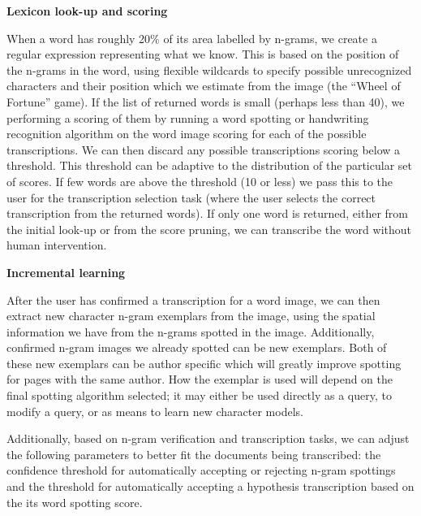 \documentclass[ms]{byuprop}
\begin{document}
\textbf{Lexicon look-up and scoring}

\begin{addmargin}[3em]{3em}
When a word has roughly 20\% of its area labelled by n-grams, we create a regular expression representing what we know. This is based on the position of the n-grams in the word, using flexible wildcards to specify possible unrecognized characters and their position which we estimate from the image (the ``Wheel of Fortune'' game). If the list of returned words is small (perhaps less than 40), we performing a scoring of them by running a word spotting or handwriting recognition algorithm on the word image scoring for each of the possible transcriptions. We can then discard any possible transcriptions scoring below a threshold. This threshold can be adaptive to the distribution of the particular set of scores. If few words are above the threshold (10 or less) we pass this to the user for the transcription selection task (where the user selects the correct transcription from the returned words). If only one word is returned, either from the initial look-up or from the score pruning, we can transcribe the word without human intervention.
\\[.5cm]
\end{addmargin}

\textbf{Incremental learning}

\begin{addmargin}[3em]{3em}
After the user has confirmed a transcription for a word image, we can then extract new character n-gram exemplars from the image, using the spatial information we have from the n-grams spotted in the image. Additionally, confirmed n-gram images we already spotted can be new exemplars. Both of these new exemplars can be author specific which will greatly improve spotting for pages with the same author. How the exemplar is used will depend on the final spotting algorithm selected; it may either be used directly as a query, to modify a query, or as means to learn new character models.


\-\hspace{1cm} Additionally, based on n-gram verification and transcription tasks, we can adjust the following parameters to better fit the documents being transcribed: the confidence threshold for automatically accepting or rejecting n-gram spottings and the threshold for automatically accepting a hypothesis transcription based on the its word spotting score.
\\[.5cm]
\end{addmargin}
\end{document}
